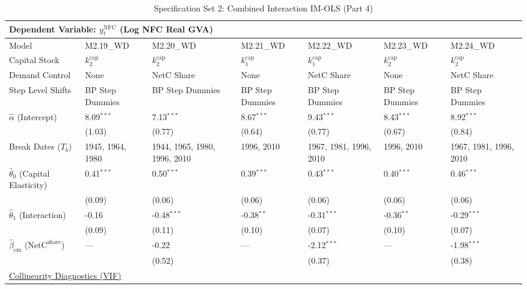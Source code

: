 \begin{table}[H]
\centering
\caption{Specification Set 2: Combined Interaction IM-OLS (Part 4)}
\label{tab:paper_spec_set_2_4}
\scriptsize
\begin{tabular}{p{3.8cm}p{1.35cm}p{1.35cm}p{1.35cm}p{1.35cm}p{1.35cm}p{1.35cm}}
\toprule
\multicolumn{7}{l}{\textbf{Dependent Variable: $y_t^{\text{NFC}}$ (Log NFC Real GVA)}} \\
\midrule
Model & M2.19\_WD & M2.20\_WD & M2.21\_WD & M2.22\_WD & M2.23\_WD & M2.24\_WD  \\
Capital Stock & $k^{\text{cap}}_2$ & $k^{\text{cap}}_2$ & $k^{\text{cap}}_1$ & $k^{\text{cap}}_1$ & $k^{\text{cap}}_2$ & $k^{\text{cap}}_2$  \\
Demand Control & None & NetC Share & None & NetC Share & None & NetC Share  \\
Step Level Shifts & BP Step Dummies & BP Step Dummies & BP Step Dummies & BP Step Dummies & BP Step Dummies & BP Step Dummies  \\
\midrule
$\hat{\alpha}$ (Intercept)  & 8.09$^{***}$ & 7.13$^{***}$ & 8.67$^{***}$ & 9.43$^{***}$ & 8.43$^{***}$ & 8.92$^{***}$  \\
 & {\scriptsize (1.03)} & {\scriptsize (0.77)} & {\scriptsize (0.64)} & {\scriptsize (0.77)} & {\scriptsize (0.67)} & {\scriptsize (0.84)}  \\
Break Dates ($T_b$) & 1945, 1964, 1980 & 1944, 1965, 1980, 1996, 2010 & 1996, 2010 & 1967, 1981, 1996, 2010 & 1996, 2010 & 1967, 1981, 1996, 2010  \\
[1ex]
$\hat{\theta}_0$ (Capital Elasticity)  & 0.41$^{***}$ & 0.50$^{***}$ & 0.39$^{***}$ & 0.43$^{***}$ & 0.40$^{***}$ & 0.46$^{***}$  \\
 & {\scriptsize (0.09)} & {\scriptsize (0.06)} & {\scriptsize (0.06)} & {\scriptsize (0.06)} & {\scriptsize (0.06)} & {\scriptsize (0.06)}  \\
$\hat{\theta}_1$ (Interaction)  & -0.16 & -0.48$^{***}$ & -0.38$^{**}$ & -0.31$^{***}$ & -0.36$^{**}$ & -0.29$^{***}$  \\
 & {\scriptsize (0.09)} & {\scriptsize (0.11)} & {\scriptsize (0.10)} & {\scriptsize (0.07)} & {\scriptsize (0.10)} & {\scriptsize (0.07)}  \\
$\hat{\beta}_{\text{cm}}$ ($\text{NetC}^{\text{share}}$)  & --- & -0.22 & --- & -2.12$^{***}$ & --- & -1.98$^{***}$  \\
 &  & {\scriptsize (0.52)} &  & {\scriptsize (0.37)} &  & {\scriptsize (0.38)}  \\
\midrule
\multicolumn{7}{l}{\underline{Collinearity Diagnostics (VIF)}} \\

\end{tabular}
\end{table}

